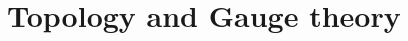 \documentclass[reprint,prb,superscriptaddress]{revtex4-1}
\begin{document}
 \section{Topology and Gauge theory}




%
%
\end{document}
